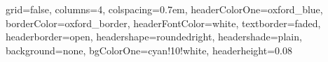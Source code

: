 \documentclass[a0paper,portrait,fontscale=0.35]{baposter}
\begin{document}

\begin{poster}
  {
    grid=false,
    columns=4,
    colspacing=0.7em,
    headerColorOne=oxford_blue,
    borderColor=oxford_border,
    headerFontColor=white,
    textborder=faded,
    headerborder=open,
    headershape=roundedright,
    headershade=plain,
    background=none,
    bgColorOne=cyan!10!white,
    headerheight=0.08\textheight
  }
  {
    }
\end{poster}
\end{document}
